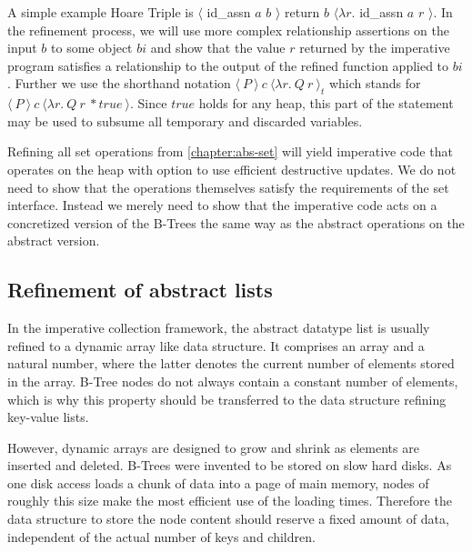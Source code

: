 A simple example Hoare Triple is 
$\langle$ id\_assn $a$ $b$ $\rangle$ return $b$ $\langle \lambda r.$ id\_assn $a$ $r$ $\rangle$.
In the refinement process, we will use more complex relationship assertions
on the input $b$ to some object $bi$ and show that the value $r$ returned
by the imperative program satisfies a relationship to the output of the refined
function applied to $bi$.
Further we use the shorthand notation $\langle\ P\ \rangle\ c\ \langle \lambda r.\ Q\ r\ \rangle_t$
which stands for $\langle\ P\ \rangle\ c\ \langle \lambda r.\ Q\ r\ * true\ \rangle$.
Since $true$ holds for any heap, this part of the statement may be used to subsume
all temporary and discarded variables.

Refining all set operations from \autoref{chapter:abs-set}
will yield imperative code that operates on the heap
with option to use efficient destructive updates.
We do not need to show that the operations themselves
satisfy the requirements of the set interface.
Instead we merely need to show that the imperative code
acts on a concretized version of the B-Trees
the same way as the abstract operations on the abstract version.


\subsection{Refinement of abstract lists}

In the imperative collection framework\parencite{DBLP:journals/jar/Lammich19},
the abstract datatype list is usually
refined to a dynamic array like data structure.
It comprises an array and a natural number,
where the latter denotes the current number of elements
stored in the array.
B-Tree nodes do not always contain a constant number of elements,
which is why this property should be transferred to
the data structure refining key-value lists. 

However, dynamic arrays are designed to grow and shrink
as elements are inserted and deleted.
B-Trees were invented to be stored on slow hard disks.
As one disk access loads a chunk of data into a page of main memory,
nodes of roughly this size make the most efficient use of the loading times.
\parencite{DBLP:journals/acta/BayerM72}
Therefore the data structure to store the node content
should reserve a fixed amount of data, independent
of the actual number of keys and children.

